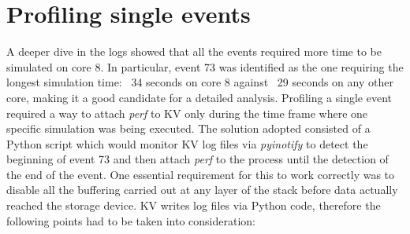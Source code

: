 \documentclass[a4paper]{jpconf}
\begin{document}
\section{Profiling single events}
A deeper dive in the logs showed that all the events required more time to be
simulated on core 8. In particular, event 73 was identified as the one
requiring the longest simulation time: ~34 seconds on core 8 against ~29 seconds
on any other core, making it a good candidate for a detailed analysis. Profiling
a single event required a way to attach \textit{perf} to KV only during the time frame
where one specific simulation was being executed. The solution adopted consisted
of a Python script which would monitor KV log files via \textit{pyinotify} to detect
the beginning of event 73 and then attach \textit{perf} to the process until the
detection of the end of the event. One essential requirement for this to work correctly
was to disable all the buffering carried out at any layer of the stack before
data actually reached the storage device. KV writes log files via Python code,
therefore the following points had to be taken into consideration:

\end{document}
